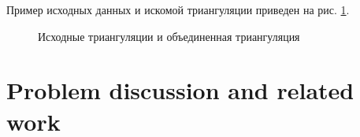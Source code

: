 \documentclass[12pt]{article}
\begin{document}
Пример исходных данных и искомой триангуляции приведен на рис. \ref{fig:model_data}.

\begin{figure}[htb!]
	\begin{minipage}[h]{0.49\linewidth}
	\end{minipage}
	\hfill
	\begin{minipage}[h]{0.49\linewidth}
	\end{minipage}
	\caption{Исходные триангуляции и объединенная триангуляция}
	\label{fig:model_data}
\end{figure}

\section{\color{red} Problem discussion and related work}
\end{document}
